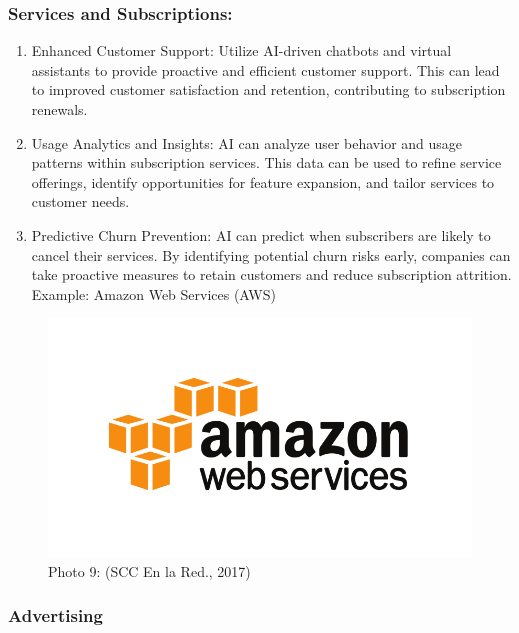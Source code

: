 \documentclass[
]{article}
\begin{document}
\hypertarget{services-and-subscriptions}{%
\subsubsection{Services and Subscriptions:}\label{services-and-subscriptions}}

\begin{enumerate}
\def\labelenumi{\arabic{enumi}.}
\item
  Enhanced Customer Support: Utilize AI-driven chatbots and virtual assistants to provide proactive and efficient customer support. This can lead to improved customer satisfaction and retention, contributing to subscription renewals.
\item
  Usage Analytics and Insights: AI can analyze user behavior and usage patterns within subscription services. This data can be used to refine service offerings, identify opportunities for feature expansion, and tailor services to customer needs.
\item
  Predictive Churn Prevention: AI can predict when subscribers are likely to cancel their services. By identifying potential churn risks early, companies can take proactive measures to retain customers and reduce subscription attrition.
  Example: Amazon Web Services (AWS)
\end{enumerate}

\begin{figure}
\centering
\includegraphics{tech2.png}
\caption{Photo 9: (SCC En la Red., 2017)}
\end{figure}

\hypertarget{advertising}{%
\subsubsection{Advertising}\label{advertising}}
\end{document}
